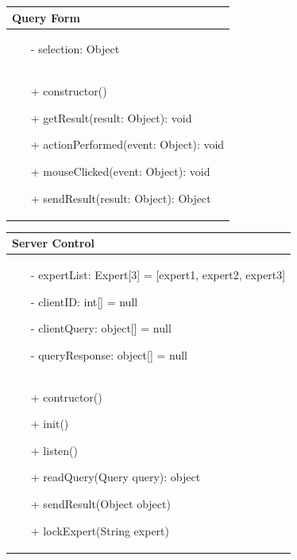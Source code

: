 \documentclass[]{article}
\begin{document}
%
\begin{table}[H]
\centering
\begin{tabular}{|>{\centering\arraybackslash}p{10cm}|}
\hline
Query Form\\
\hline
\begin{itemize}
\item[-] selection: Object
\end{itemize}
\\
\hline
\begin{itemize}
\item[+] constructor()
\item[+] getResult(result: Object): void
\item[+] actionPerformed(event: Object): void
\item[+] mouseClicked(event: Object): void
\item[+] sendResult(result: Object): Object
\end{itemize}
\\
\hline
\end{tabular}
\end{table}
%
\begin{table}[H]
\centering
\begin{tabular}{|>{\centering\arraybackslash}p{10cm}|}
\hline
Server Control\\
\hline
\begin{itemize}
\item[-] expertList: Expert[3] = [expert1, expert2, expert3]
\item[-] clientID: int[] = null
\item[-] clientQuery: object[] = null
\item[-] queryResponse: object[] = null

\end{itemize}
\\
\hline
\begin{itemize}
\item[+] contructor()
\item[+] init()
\item[+] listen()
\item[+] readQuery(Query query): object
\item[+] sendResult(Object object)
\item[+] lockExpert(String expert)
\end{itemize}
\\
\hline
\end{tabular}
\end{table}
%
\end{document}
